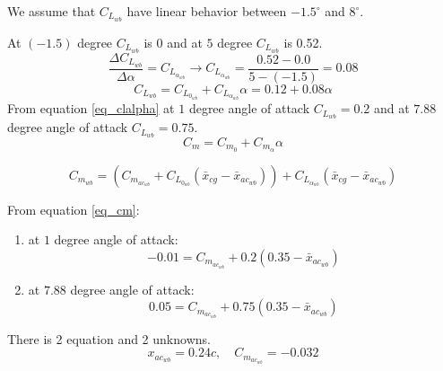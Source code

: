 We assume that $C_{L_{wb}}$ have linear behavior between $-1.5^{\circ}$ and $8^{\circ}$.


At $(-1.5)$ degree $C_{L_{wb}}$ is $0$ and at $5$ degree $C_{L_{wb}}$ is 0.52.
$$\dfrac{\Delta C_{L_{wb}}}{\Delta \alpha} = C_{L_{\alpha_{wb}}}\to C_{L_{\alpha_{wb}}} = \dfrac{0.52 - 0.0}{5 - (-1.5)} = 0.08$$
\begin{equation}
C_{L_{wb}}= C_{L_{0_{wb}}}+C_{L_{\alpha_{wb}}}\alpha = 0.12 + 0.08\alpha
\label{eq_clalpha}
\end{equation}
From equation \ref{eq_clalpha} at $1$ degree angle of attack $C_{L_{wb}} = 0.2$ and at $7.88$ degree angle of attack $C_{L_{wb}} = 0.75$.
\begin{equation}
C_m = C_{m_0} + C_{m_\alpha}\alpha
\label{eq_cm}
\end{equation}


\begin{equation}
C_{m_{wb}} = (C_{m_{ac_{wb}}} + C_{L_{0_{wb}}}(\bar x_{cg} - \bar x_{ac_{wb}})) +
C_{L_{\alpha_{wb}}}(\bar x_{cg} - \bar x_{ac_{wb}})
\label{eq_cm}
\end{equation}


From equation \ref{eq_cm}:
\begin{enumerate}
    \item at $1$ degree angle of attack:
    $$-0.01 = C_{m_{ac_{wb}}}  + 0.2 (0.35-\bar x_{ac_{wb}}) $$
    \item at $7.88$ degree angle of attack:
    $$0.05 =C_{m_{ac_{wb}}} +  0.75(0.35-\bar x_{ac_{wb}}) $$
\end{enumerate}
There is 2 equation and 2 unknowns.
$$x_{ac_{wb}} = 0.24c,\quad C_{m_{ac_{wb}}} = -0.032$$



